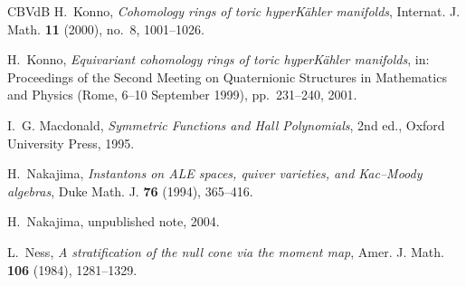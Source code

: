 \documentclass[11pt]{amsart}
\theoremstyle{definition}
\theoremstyle{remark}
\numberwithin{equation}{section}
\begin{document}
\begin{thebibliography}{CBVdB}
H.~Konno, \emph{Cohomology rings of toric hyperK\"ahler manifolds}, Internat. J. Math. \textbf{11}
(2000), no.~8, 1001--1026.

H.~Konno, \emph{Equivariant cohomology rings of toric hyperK\"ahler manifolds}, in: Proceedings of the
Second Meeting on Quaternionic Structures in Mathematics and Physics (Rome, 6--10 September 1999),
pp.~231--240, 2001.

I.~G. Macdonald, \emph{Symmetric Functions and Hall Polynomials}, 2nd ed., Oxford University Press, 1995.

H.~Nakajima, \emph{Instantons on ALE spaces, quiver varieties, and Kac--Moody algebras}, Duke Math. J.
\textbf{76} (1994), 365--416.

H.~Nakajima, unpublished note, 2004.

L.~Ness, \emph{A stratification of the null cone via the moment map}, Amer. J. Math. \textbf{106} (1984),
1281--1329.

\end{thebibliography}
\end{document}
